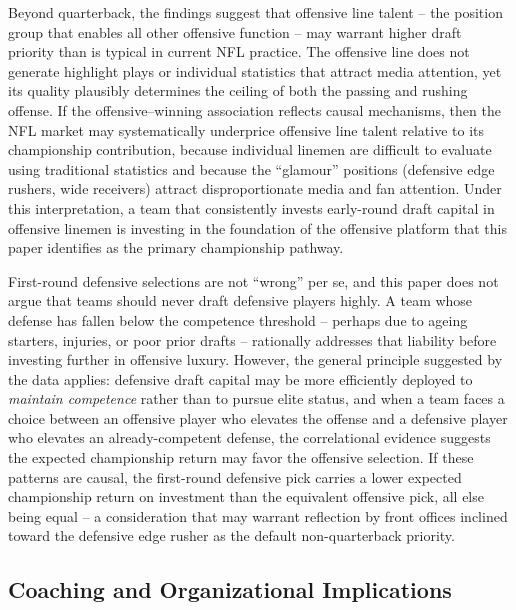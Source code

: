 Beyond quarterback, the findings suggest that offensive line talent -- the
position group that enables all other offensive function -- may warrant
higher draft priority than is typical in current NFL practice. The offensive
line does not generate highlight plays or individual statistics that attract
media attention, yet its quality plausibly determines the ceiling of both the
passing and rushing offense. If the offensive--winning association reflects
causal mechanisms, then the NFL market may systematically underprice offensive
line talent relative to its championship contribution, because individual
linemen are difficult to evaluate using traditional statistics and because the
``glamour'' positions (defensive edge rushers, wide receivers) attract
disproportionate media and fan attention. Under this interpretation, a team
that consistently invests early-round draft capital in offensive linemen is
investing in the foundation of the offensive platform that this paper
identifies as the primary championship pathway.

First-round defensive selections are not ``wrong'' per se, and this paper
does not argue that teams should never draft defensive players highly. A team
whose defense has fallen below the competence threshold -- perhaps due to
ageing starters, injuries, or poor prior drafts -- rationally addresses that
liability before investing further in offensive luxury. However, the general
principle suggested by the data applies: defensive draft capital may be more
efficiently deployed to \emph{maintain competence} rather than to pursue elite
status, and when a team faces a choice between an offensive player who elevates
the offense and a defensive player who elevates an already-competent defense,
the correlational evidence suggests the expected championship return may favor
the offensive selection. If these patterns are causal, the first-round
defensive pick carries a lower expected championship return on investment than
the equivalent offensive pick, all else being equal -- a consideration that
may warrant reflection by front offices inclined toward the defensive edge
rusher as the default non-quarterback priority.

\subsection{Coaching and Organizational Implications}
\label{sec:coaching-implications}

